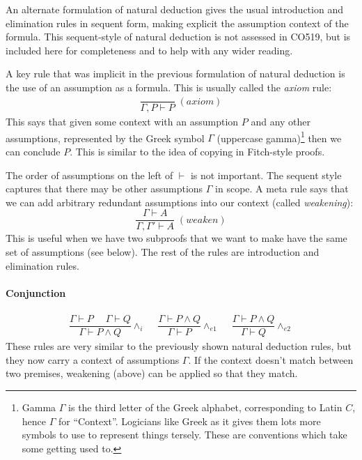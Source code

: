 An alternate formulation of natural deduction gives the usual
introduction and elimination rules in sequent form, making explicit
the assumption context of the formula. This sequent-style of natural
deduction is not assessed in CO519, but is included here for
completeness and to help with any wider reading.

A key rule that was implicit in the previous formulation of natural
deduction is the use of an assumption as a formula. This is usually
called the \emph{axiom} rule:
%
\begin{align*}
\dfrac{\qquad}{\Gamma, P \vdash P} \; (\textit{axiom})
\end{align*}
%
This says that given some context with an assumption $P$ and any other
assumptions, represented by the Greek symbol $\Gamma$ (uppercase
gamma)\footnote{Gamma $\Gamma$ is the third letter of the Greek
  alphabet, corresponding to Latin $C$, hence $\Gamma$ for
  ``Context''. Logicians like Greek as it gives them lots more symbols
  to use to represent things tersely. These are conventions which take
  some getting used to.} then we can conclude $P$.  This is similar to
the idea of copying in Fitch-style proofs.

The order of assumptions on the left of $\vdash$ is not important.
The sequent style captures that
there may be other assumptions $\Gamma$ in scope.  A meta rule says
that we can add arbitrary redundant assumptions into our context
(called \emph{weakening}):
%
\begin{equation*}
  \dfrac{\Gamma \vdash A}
        {\Gamma, \Gamma' \vdash A} \; (\textit{weaken})
  \end{equation*}
This is useful when we have two subproofs that we want to
make have the same set of assumptions (see below). The rest
of the rules are introduction and elimination rules.

\paragraph{Conjunction}

\begin{align*}
\dfrac{\Gamma \vdash P \quad\; \Gamma \vdash Q}{\Gamma \vdash P \wedge
  Q} {\wedge_i}
\quad\;
\dfrac{\Gamma \vdash P \wedge Q}{\Gamma \vdash P} {\wedge_{e1}}
\quad\;
\dfrac{\Gamma \vdash P \wedge Q}{\Gamma \vdash Q} {\wedge_{e2}}
\end{align*}
%
These rules are very similar to the previously shown natural
deduction rules, but they now carry a context of assumptions
$\Gamma$. If the context doesn't match between
two premises, weakening (above) can be applied so that they match.

